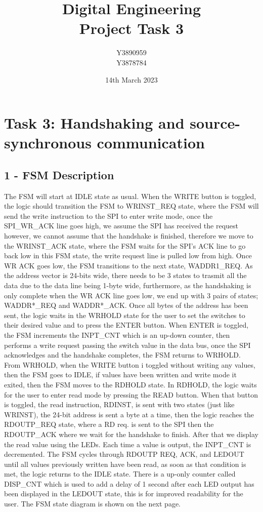 \documentclass[11pt]{report}
\title{Digital Engineering\\Project Task 3}
\author{Y3890959\\Y3878784}
\date{14th March 2023}
\begin{document}
\maketitle

\chapter*{Task 3: Handshaking and source-synchronous communication}

\section*{1 - FSM Description}

The FSM will start at IDLE state as usual. When the WRITE button is toggled, the logic should transition the
FSM to WRINST\_REQ state, where the FSM will send the write instruction to the SPI to enter write mode, once
the SPI\_WR\_ACK line goes high, we assume the SPI has received the request however, we cannot assume that the
handshake is finished, therefore we move to the WRINST\_ACK state, where the FSM waits for the SPI's ACK
line to go back low in this FSM state, the write request line is pulled low from high. Once WR ACK goes low,
the FSM transitions to the next state, WADDR1\_REQ. As the address vector is 24-bits wide, there needs to be 3
states to trasmit all the data due to the data line being 1-byte wide, furthermore, as the handshaking is only
complete when the WR ACK line goes low, we end up with 3 pairs of states; WADDR*\_REQ and WADDR*\_ACK. Once
all bytes of the address has been sent, the logic waits in the WRHOLD state for the user to set the switches
to their desired value and to press the ENTER button. When ENTER is toggled, the FSM increments the INPT\_CNT 
which is an up-down counter, then performs a write request passing the switch value in the data bus, once the
SPI acknowledges and the handshake completes, the FSM returns to WRHOLD. From WRHOLD, when the WRITE button i
toggled without writing any values, then the FSM goes to IDLE, if values have been written and write mode it
exited, then the FSM moves to the RDHOLD state. In RDHOLD, the logic waits for the user to enter read mode by
pressing the READ button. When that button is toggled, the read instruction, RDINST, is sent with two states
(just like WRINST), the 24-bit address is sent a byte at a time, then the logic reaches the RDOUTP\_REQ state,
where a RD req. is sent to the SPI then the RDOUTP\_ACK where we wait for the handshake to finish. After that
we display the read value using the LEDs. Each time a value is output, the INPT\_CNT is decremented. The FSM
cycles through RDOUTP REQ, ACK, and LEDOUT until all values previously written have been read, as soon as that
condition is met, the logic returns to the IDLE state. There is a up-only counter called DISP\_CNT which is
used to add a delay of 1 second after each LED output has been displayed in the LEDOUT state, this is for
improved readability for the user. The FSM state diagram is shown on the next page.
\end{document}
